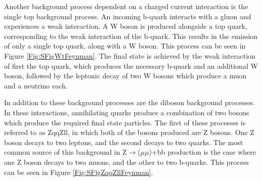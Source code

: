 \documentclass[12pt,a4paper,epsf,portrait,times,epsfig]{article}
\begin{document}

		
		Another background process dependent on a charged current interaction is the single top background process. An incoming b-quark interacts with a gluon and experiences a weak interaction. A W boson is produced alongside a top quark, corresponding to the weak interaction of the b-quark. This results in the emission of only a single top quark, along with a W boson. This process can be seen in Figure \ref{Fig:SFigWtFeynman}. The final state is achieved by the weak interaction of first the top quark, which produces the necessary b-quark and an additional W boson, followed by the leptonic decay of two W bosons which produce a muon and a neutrino each. \par
		
		In addition to these background processes are the diboson background processes. In these interactions, annihilating quarks produce a combination of two bosons which produce	the required final state particles. The first of these processes is referred to as ZqqZll, in which both of the bosons produced are Z bosons. One Z boson decays to two leptons, and the second decays to two quarks. The most common source of this background in Z$\rightarrow$($\mu\mu$)+bb production is the case where one Z boson decays to two muons, and the other to two b-quarks. This	process can be seen in Figure \ref{Fig:SFigZqqZllFeynman}. \par
		
\end{document}
